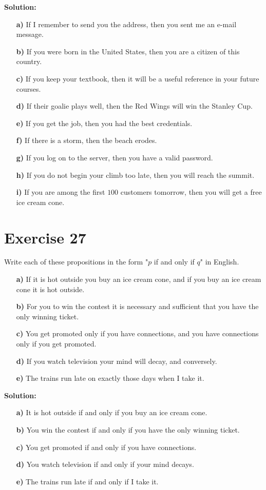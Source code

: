 \documentclass{Axon}
\begin{document}
\noindent
\textbf{Solution:}
\begin{enumerate}
    \item[\textbf{a)}] If I remember to send you the address, then you sent me an e-mail message.
    \item[\textbf{b)}] If you were born in the United States, then you are a citizen of this country.
    \item[\textbf{c)}] If you keep your textbook, then it will be a useful reference in your future courses.
    \item[\textbf{d)}] If their goalie plays well, then the Red Wings will win the Stanley Cup.
    \item[\textbf{e)}] If you get the job, then you had the best credentials.
    \item[\textbf{f)}] If there is a storm, then the beach erodes.
    \item[\textbf{g)}] If you log on to the server, then you have a valid password.
    \item[\textbf{h)}] If you do not begin your climb too late, then you will reach the summit.
    \item[\textbf{i)}] If you are among the first \(100\) customers tomorrow, then you will get a free ice cream cone.
\end{enumerate}

\section*{Exercise 27}
Write each of these propositions in the form "\(p\) if and only if \(q\)" in English.
\begin{enumerate}
    \item[\textbf{a)}] If it is hot outside you buy an ice cream cone, and if you buy an ice cream cone it is hot outside.
    \item[\textbf{b)}] For you to win the contest it is necessary and sufficient that you have the only winning ticket. 
    \item[\textbf{c)}] You get promoted only if you have connections, and you have connections only if you get promoted.
    \item[\textbf{d)}] If you watch television your mind will decay, and conversely.
    \item[\textbf{e)}] The trains run late on exactly those days when I take it.
\end{enumerate}

\noindent
\textbf{Solution:}
\begin{enumerate}
    \item[\textbf{a)}] It is hot outside if and only if you buy an ice cream cone.
    \item[\textbf{b)}] You win the contest if and only if you have the only winning ticket.
    \item[\textbf{c)}] You get promoted if and only if you have connections.
    \item[\textbf{d)}] You watch television if and only if your mind decays.
    \item[\textbf{e)}] The trains run late if and only if I take it.
\end{enumerate}
\end{document}
